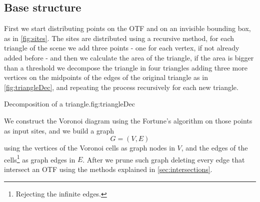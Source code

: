 \documentclass[dissertation.tex]{subfiles}
\begin{document}
\subsection{Base structure}
First we
start distributing points on the \ac{OTF} and on
an invisible bounding box, as in \cref{fig:sites}.
The sites are distributed using a recursive method, for each triangle
of the scene we add three points - one for each
vertex, if not already added before - and then we calculate the area
of the triangle, if the area is bigger than a threshold we decompose
the triangle in four triangles adding three more vertices on the
midpoints of the edges of the original triangle as in
\cref{fig:triangleDec}, and repeating the process recursively for
each new triangle.
\begin{myfig}{Decomposition of a triangle.}{fig:triangleDec}
\end{myfig}

We construct the Voronoi diagram using the Fortune's algorithm
\cite{fortune} on
those points as input sites, and we build a graph
$$G=(V,E)$$
using the vertices
of the Voronoi cells as graph nodes in $V$, and the edges of the cells\footnote{Rejecting the
  infinite edges.} as graph edges in $E$. After we prune such graph deleting every edge that
intersect an \ac{OTF} using the methods explained in \cref{sec:intersections}.
\end{document}
